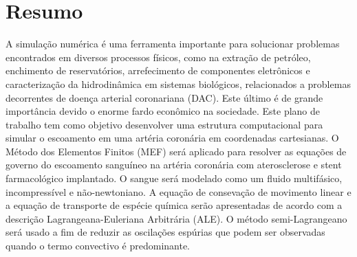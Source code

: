\section{Resumo}

A simulação numérica é uma ferramenta importante para solucionar problemas encontrados em diversos
processos físicos, como na extração de petróleo, enchimento de reservatórios, arrefecimento de
componentes eletrônicos e caracterização da hidrodinâmica em sistemas biológicos, relacionados a
problemas decorrentes de doença arterial coronariana (DAC). Este último é de grande importância devido
o enorme fardo econômico na sociedade. Este plano de trabalho tem como objetivo desenvolver uma
estrutura computacional para simular o escoamento em uma artéria coronária em coordenadas cartesianas.
O Método dos Elementos Finitos (MEF) será aplicado para resolver as equações de governo do
escoamento sanguíneo na artéria coronária com aterosclerose e stent farmacológico implantado. O sangue
será modelado como um fluido multifásico, incompressível e não-newtoniano. A equação de consevação de movimento linear e a equação de transporte de espécie química serão apresentadas de acordo com a descrição Lagrangeana-Euleriana Arbitrária (ALE). O método semi-Lagrangeano será usado a fim de reduzir as oscilações espúrias que podem ser observadas
quando o termo convectivo é predominante.
